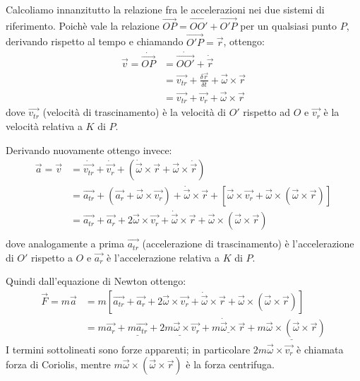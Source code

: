 \documentclass[../main.tex]{subfiles}
\begin{document}
Calcoliamo innanzitutto la relazione fra le accelerazioni nei due sistemi di riferimento. Poichè vale la
relazione $\overrightarrow{OP}=\overrightarrow{OO'}+\overrightarrow{O'P}$ per un qualsiasi punto $P$, derivando 
rispetto al tempo e chiamando $\overrightarrow{O'P}=\vec{r}$, ottengo:
\begin{equation}\label{VelNonInerziale}
\begin{split}
	\vec{v}=\dot{\overrightarrow{OP}}	& =\dot{\overrightarrow{OO'}}+\dot{\vec{r}}\\
													& =\overrightarrow{v_{tr}}+\frac{\delta \vec r}{\delta t}+\vec{\omega}\times\vec{r}\\
													& =\overrightarrow{v_{tr}}+\vec{v_r}+\vec{\omega}\times\vec{r}
\end{split}
\end{equation}
dove $\overrightarrow{v_{tr}}$ (velocità di trascinamento) è la velocità di $O'$ rispetto ad $O$ e $\overrightarrow{v_r}$ è la velocità relativa
a $K$ di $P$.

Derivando nuovamente ottengo invece:
\begin{equation}\label{AccNonInerziale}
\begin{split}
	\vec{a}=\vec{v}	& =\dot{\overrightarrow{v_{tr}}}+\dot{\vec{v_r}}+\left(\dot{\vec{\omega}}\times\vec{r}+\vec{\omega}\times\dot{\vec{r}}\right)\\
											& =\overrightarrow{a_{tr}}+\left(\vec{a_r}+\vec{\omega}\times\vec{v_r}\right)+\dot{\vec{\omega}}\times\vec{r}+\left[\vec{\omega}\times\vec{v_r}+\vec{\omega}\times(\vec{\omega}\times\vec{r})\right]\\
											& =\overrightarrow{a_{tr}}+\vec{a_r}+2\vec{\omega}\times\vec{v_r}+\dot{\vec{\omega}}\times\vec{r}+\vec{\omega}\times(\vec{\omega}\times\vec{r})\\
\end{split}
\end{equation}
dove analogamente a prima $\overrightarrow{a_{tr}}$ (accelerazione di trascinamento) è l'accelerazione di $O'$ rispetto a $O$ e $\overrightarrow{a_r}$ è l'accelerazione relativa a $K$ di $P$.

Quindi dall'equazione di Newton ottengo:
\begin{equation*}
\begin{split}
	\vec{F}=m\vec{a}	& =m\left[\overrightarrow{a_{tr}}+\vec{a_r}+2\vec{\omega}\times\vec{v_r}+\dot{\vec{\omega}}\times\vec{r}+\vec{\omega}\times(\vec{\omega}\times\vec{r})\right]\\
											& =m\vec{a_r}+\underline{m\overrightarrow{a_{tr}}}+\underline{2m\vec{\omega}\times\vec{v_r}}+\underline{m\dot{\vec{\omega}}\times\vec{r}}+\underline{m\vec{\omega}\times(\vec{\omega}\times\vec{r})}
\end{split}
\end{equation*}
I termini sottolineati sono forze apparenti; in particolare $2m\vec{\omega}\times\vec{v_r}$
è chiamata forza di Coriolis, mentre $m\vec{\omega}\times(\vec{\omega}\times\vec{r})$
è la forza centrifuga.
\end{document}
